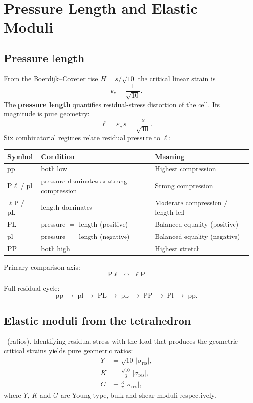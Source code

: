 \section{Pressure Length and Elastic Moduli}
\label{sec:moduli}

\subsection{Pressure length}
From the Boerdijk--Coxeter rise $H=s/\sqrt{10}$ the critical linear strain is
\[
\varepsilon_c=\frac{1}{\sqrt{10}}.
\]
The \textbf{pressure length} quantifies residual-stress distortion of the cell.
Its magnitude is pure geometry:
\[
\ell=\varepsilon_c\,s=\frac{s}{\sqrt{10}}.
\]
Six combinatorial regimes relate residual pressure to $\ell$:

\begin{center}
\begin{tabular}{lll}
\toprule
Symbol & Condition & Meaning \\
\midrule
$\mathrm{pp}$ & both low & Highest compression \\
$\mathrm{P}\ell$ / $\mathrm{pl}$ & pressure dominates or strong compression & Strong compression \\
$\ell\mathrm{P}$ / $\mathrm{pL}$ & length dominates & Moderate compression / length-led \\
$\mathrm{PL}$ & pressure $=$ length (positive) & Balanced equality (positive) \\
$\mathrm{pl}$ & pressure $=$ length (negative) & Balanced equality (negative) \\
$\mathrm{PP}$ & both high & Highest stretch \\
\bottomrule
\end{tabular}
\end{center}

Primary comparison axis:
\[
\mathrm{P}\ell \;\longleftrightarrow\; \ell\mathrm{P}
\]

Full residual cycle:
\[
\mathrm{pp}\;\to\;\mathrm{pl}\;\to\;\mathrm{PL}\;\to\;\mathrm{pL}\;\to\;\mathrm{PP}\;\to\;\mathrm{Pl}\;\to\;\mathrm{pp}.
\]

\subsection{Elastic moduli from the tetrahedron}
\derived\ (ratios). Identifying residual stress with the load that produces the
geometric critical strains yields pure geometric ratios:
\begin{align*}
Y&=\sqrt{10}\,|\sigma_{\mathrm{res}}|,\\
K&=\frac{\sqrt{10}}{3}\,|\sigma_{\mathrm{res}}|,\\
G&=\frac{3}{\pi}\,|\sigma_{\mathrm{res}}|,
\end{align*}
where $Y$, $K$ and $G$ are Young-type, bulk and shear moduli respectively.
